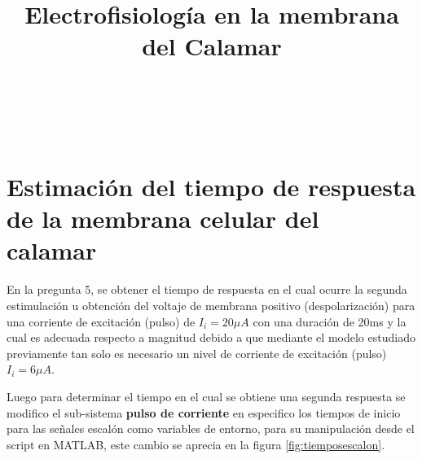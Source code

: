 \documentclass[conference]{IEEEtran}
\begin{document}
	
	\title{Electrofisiología en la membrana del Calamar}
	\author{
		\\
		\\
		\\
		\and
		\and
	}
	
	\maketitle
	\begin{abstract}
		
	\end{abstract}
	
	\begin{IEEEkeywords}
		
	\end{IEEEkeywords}
	
	\section{Estimación del tiempo de respuesta de la membrana celular del calamar}
	
	En la pregunta 5, se obtener el tiempo de respuesta en el cual ocurre la segunda estimulación u obtención del voltaje de membrana positivo (despolarización) para una corriente de excitación (pulso) de $I_i = 20\mu A$ con una duración de 20ms y la cual es adecuada respecto a magnitud debido a que mediante el modelo estudiado previamente tan solo es necesario un nivel de corriente de excitación (pulso) $I_i = 6\mu A$.
	
	Luego para determinar el tiempo en el cual se obtiene una segunda respuesta se modifico el sub-sistema \textbf{pulso de corriente} en especifico los tiempos de inicio para las señales escalón como variables de entorno, para su manipulación desde el script en MATLAB, este cambio se aprecia en la figura \ref{fig:tiemposescalon}.
	
\end{document}
